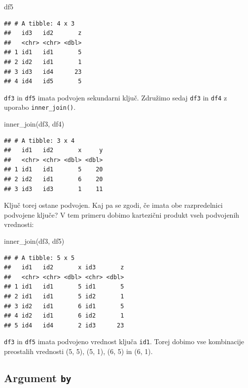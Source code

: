 \documentclass[
]{book}
\newenvironment{Shaded}{\begin{snugshade}}{\end{snugshade}}
\newcommand{\FunctionTok}[1]{\textcolor[rgb]{0.00,0.00,0.00}{#1}}
\newcommand{\NormalTok}[1]{#1}
\begin{document}
\begin{Shaded}
\begin{Highlighting}[]
\NormalTok{df5}
\end{Highlighting}
\end{Shaded}

\begin{verbatim}
## # A tibble: 4 x 3
##   id3   id2       z
##   <chr> <chr> <dbl>
## 1 id1   id1       5
## 2 id2   id1       1
## 3 id3   id4      23
## 4 id4   id5       5
\end{verbatim}

\texttt{df3} in \texttt{df5} imata podvojen sekundarni ključ. Združimo sedaj \texttt{df3} in \texttt{df4} z uporabo \texttt{inner\_join()}.

\begin{Shaded}
\begin{Highlighting}[]
\FunctionTok{inner\_join}\NormalTok{(df3, df4)}
\end{Highlighting}
\end{Shaded}

\begin{verbatim}
## # A tibble: 3 x 4
##   id1   id2       x     y
##   <chr> <chr> <dbl> <dbl>
## 1 id1   id1       5    20
## 2 id2   id1       6    20
## 3 id3   id3       1    11
\end{verbatim}

Ključ torej ostane podvojen. Kaj pa se zgodi, če imata obe razpredelnici podvojene ključe? V tem primeru dobimo kartezični produkt vseh podvojenih vrednosti:

\begin{Shaded}
\begin{Highlighting}[]
\FunctionTok{inner\_join}\NormalTok{(df3, df5)}
\end{Highlighting}
\end{Shaded}

\begin{verbatim}
## # A tibble: 5 x 5
##   id1   id2       x id3       z
##   <chr> <chr> <dbl> <chr> <dbl>
## 1 id1   id1       5 id1       5
## 2 id1   id1       5 id2       1
## 3 id2   id1       6 id1       5
## 4 id2   id1       6 id2       1
## 5 id4   id4       2 id3      23
\end{verbatim}

\texttt{df3} in \texttt{df5} imata podvojeno vrednost ključa \texttt{id1}. Torej dobimo vse kombinacije preostalih vrednosti (5, 5), (5, 1), (6, 5) in (6, 1).

\hypertarget{argument-by}{%
\subsection{\texorpdfstring{Argument \texttt{by}}{Argument by}}\label{argument-by}}
\end{document}
